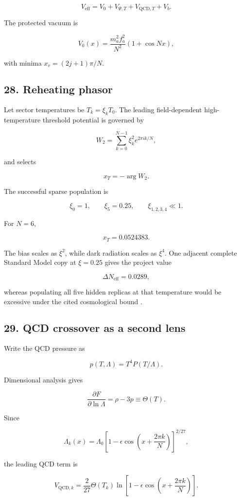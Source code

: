 \documentclass[
]{article}
\begin{document}
\[
V_{\mathrm{eff}}=V_0+V_{\Psi,T}+V_{{\mathrm{QCD}},T}+V_b.
\]

The protected vacuum is

\[
V_0(x)=\frac{m_a^2f_a^2}{N^2}(1+\cos Nx),
\]

with minima \(x_v=(2j+1)\pi/N\).

\subsection{28. Reheating phasor}\label{reheating-phasor}

Let sector temperatures be \(T_k=\xi_kT_0\). The leading field-dependent
high-temperature threshold potential is governed by

\[
W_2=\sum_{k=0}^{N-1}\xi_k^2e^{2\pi ik/N},
\]

and selects

\[
x_T=-\arg W_2.
\]

The successful sparse population is

\[
\xi_0=1,
\qquad
\xi_5=0.25,
\qquad
\xi_{1,2,3,4}\ll1.
\]

For \(N=6\),

\[
x_T=0.0524383.
\]

The bias scales as \(\xi^2\), while dark radiation scales as \(\xi^4\).
One adjacent complete Standard Model copy at \(\xi=0.25\) gives the
project value

\[
\Delta N_{\mathrm{eff}}=0.0289,
\]

whereas populating all five hidden replicas at that temperature would be
excessive under the cited cosmological bound
.

\subsection{29. QCD crossover as a second
lens}\label{qcd-crossover-as-a-second-lens}

Write the QCD pressure as

\[
p(T,\Lambda)=T^4P(T/\Lambda).
\]

Dimensional analysis gives

\[
\frac{\partial F}{\partial\ln\Lambda}=\rho-3p\equiv\Theta(T).
\]

Since

\[
\Lambda_k(x)=\Lambda_0
\left[1-\epsilon\cos\left(x+\frac{2\pi k}{N}\right)\right]^{2/27},
\]

the leading QCD term is

\[
\boxed{
V_{{\mathrm{QCD}},k}
=\frac{2}{27}\Theta(T_k)
\ln\left[1-\epsilon\cos\left(x+\frac{2\pi k}{N}\right)\right].
}
\]
\end{document}

